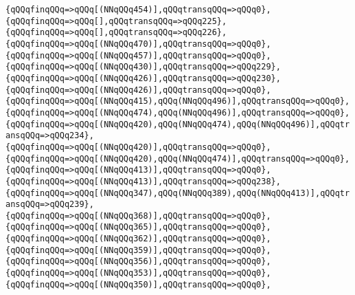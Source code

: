 \verb|{qQQqfinqQQq=>qQQq[(NNqQQq454)],qQQqtransqQQq=>qQQq0},|\newline
\verb|{qQQqfinqQQq=>qQQq[],qQQqtransqQQq=>qQQq225},|\newline
\verb|{qQQqfinqQQq=>qQQq[],qQQqtransqQQq=>qQQq226},|\newline
\verb|{qQQqfinqQQq=>qQQq[(NNqQQq470)],qQQqtransqQQq=>qQQq0},|\newline
\verb|{qQQqfinqQQq=>qQQq[(NNqQQq457)],qQQqtransqQQq=>qQQq0},|\newline
\verb|{qQQqfinqQQq=>qQQq[(NNqQQq430)],qQQqtransqQQq=>qQQq229},|\newline
\verb|{qQQqfinqQQq=>qQQq[(NNqQQq426)],qQQqtransqQQq=>qQQq230},|\newline
\verb|{qQQqfinqQQq=>qQQq[(NNqQQq426)],qQQqtransqQQq=>qQQq0},|\newline
\verb|{qQQqfinqQQq=>qQQq[(NNqQQq415),qQQq(NNqQQq496)],qQQqtransqQQq=>qQQq0},|\newline
\verb|{qQQqfinqQQq=>qQQq[(NNqQQq474),qQQq(NNqQQq496)],qQQqtransqQQq=>qQQq0},|\newline
\verb|{qQQqfinqQQq=>qQQq[(NNqQQq420),qQQq(NNqQQq474),qQQq(NNqQQq496)],qQQqtransqQQq=>qQQq234},|\newline
\verb|{qQQqfinqQQq=>qQQq[(NNqQQq420)],qQQqtransqQQq=>qQQq0},|\newline
\verb|{qQQqfinqQQq=>qQQq[(NNqQQq420),qQQq(NNqQQq474)],qQQqtransqQQq=>qQQq0},|\newline
\verb|{qQQqfinqQQq=>qQQq[(NNqQQq413)],qQQqtransqQQq=>qQQq0},|\newline
\verb|{qQQqfinqQQq=>qQQq[(NNqQQq413)],qQQqtransqQQq=>qQQq238},|\newline
\verb|{qQQqfinqQQq=>qQQq[(NNqQQq347),qQQq(NNqQQq389),qQQq(NNqQQq413)],qQQqtransqQQq=>qQQq239},|\newline
\verb|{qQQqfinqQQq=>qQQq[(NNqQQq368)],qQQqtransqQQq=>qQQq0},|\newline
\verb|{qQQqfinqQQq=>qQQq[(NNqQQq365)],qQQqtransqQQq=>qQQq0},|\newline
\verb|{qQQqfinqQQq=>qQQq[(NNqQQq362)],qQQqtransqQQq=>qQQq0},|\newline
\verb|{qQQqfinqQQq=>qQQq[(NNqQQq359)],qQQqtransqQQq=>qQQq0},|\newline
\verb|{qQQqfinqQQq=>qQQq[(NNqQQq356)],qQQqtransqQQq=>qQQq0},|\newline
\verb|{qQQqfinqQQq=>qQQq[(NNqQQq353)],qQQqtransqQQq=>qQQq0},|\newline
\verb|{qQQqfinqQQq=>qQQq[(NNqQQq350)],qQQqtransqQQq=>qQQq0},|\newline
